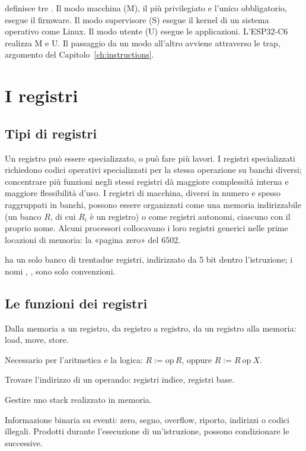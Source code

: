 \riscv definisce tre . Il modo macchina (M), il più
privilegiato e l'unico obbligatorio, esegue il firmware. Il modo supervisore
(S) esegue il kernel di un sistema operativo come Linux. Il modo utente (U)
esegue le applicazioni. L'ESP32-C6 realizza M e U. Il passaggio da un modo
all'altro avviene attraverso le trap, argomento del
Capitolo~\ref{ch:instructions}.

\section{I registri}

\subsection{Tipi di registri}

Un registro può essere specializzato, o può fare più lavori. I registri
specializzati richiedono codici operativi specializzati per la stessa
operazione su banchi diversi; concentrare più funzioni negli stessi registri
dà maggiore complessità interna e maggiore flessibilità d'uso. I registri di
macchina, diversi in numero e spesso raggruppati in banchi, possono essere
organizzati come una memoria indirizzabile (un banco $R$, di cui $R_i$ è un
registro) o come registri autonomi, ciascuno con il proprio nome. Alcuni
processori collocavano i loro registri generici nelle prime locazioni di
memoria: la «pagina zero» del 6502.

\riscv ha un solo banco di trentadue registri, indirizzato da 5 bit dentro
l'istruzione; i nomi , ,  sono solo convenzioni.

\subsection{Le funzioni dei registri}

\begin{description}[style=nextline,leftmargin=1.5em]
\item[Transito dei dati.] Dalla memoria a un registro, da registro a registro,
  da un registro alla memoria: load, move, store.
\item[Accumulo dei risultati.] Necessario per l'aritmetica e la logica:
  $R:=\mathrm{op}\,R$, oppure $R:=R\ \mathrm{op}\ X$.
\item[Indirizzamento.] Trovare l'indirizzo di un operando: registri indice,
  registri base.
\item[Puntatori allo stack.] Gestire uno stack realizzato in memoria.
\item[Indicatori, o flag.] Informazione binaria su eventi: zero, segno,
  overflow, riporto, indirizzi o codici illegali. Prodotti durante
  l'esecuzione di un'istruzione, possono condizionare le successive.
\end{description}

